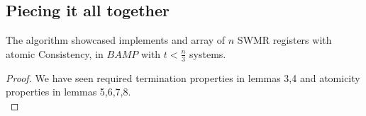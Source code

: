 \subsection{Piecing it all together}
\begin{frame}
    \begin{theorem}
        The algorithm showcased implements and array of $n$ SWMR
        registers with atomic Consistency, in $BAMP$ with $t<\frac{n}{3}$ systems.
    \end{theorem}
    \begin{proof}
        We have seen required termination properties in lemmas 3,4 and atomicity
        properties in lemmas 5,6,7,8.\\
    \end{proof}
\end{frame}
